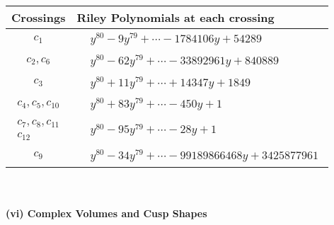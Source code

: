 \documentclass[1p]{elsarticle_modified}
\theoremstyle{definition}
\begin{document}
\begin{tabular}{m{50pt}|m{274pt}}
Crossings & \hspace{64pt}Riley Polynomials at each crossing \\
\hline $$\begin{aligned}c_{1}\end{aligned}$$&$\begin{aligned}
&y^{80}-9 y^{79}+\cdots-1784106 y+54289
\end{aligned}$\\
\hline $$\begin{aligned}c_{2},c_{6}\end{aligned}$$&$\begin{aligned}
&y^{80}-62 y^{79}+\cdots-33892961 y+840889
\end{aligned}$\\
\hline $$\begin{aligned}c_{3}\end{aligned}$$&$\begin{aligned}
&y^{80}+11 y^{79}+\cdots+14347 y+1849
\end{aligned}$\\
\hline $$\begin{aligned}c_{4},c_{5},c_{10}\end{aligned}$$&$\begin{aligned}
&y^{80}+83 y^{79}+\cdots-450 y+1
\end{aligned}$\\
\hline $$\begin{aligned}c_{7},c_{8},c_{11}\\c_{12}\end{aligned}$$&$\begin{aligned}
&y^{80}-95 y^{79}+\cdots-28 y+1
\end{aligned}$\\
\hline $$\begin{aligned}c_{9}\end{aligned}$$&$\begin{aligned}
&y^{80}-34 y^{79}+\cdots-99189866468 y+3425877961
\end{aligned}$\\
\hline
\end{tabular}\\~\\
\newpage\flushleft \textbf{(vi) Complex Volumes and Cusp Shapes}
\end{document}
